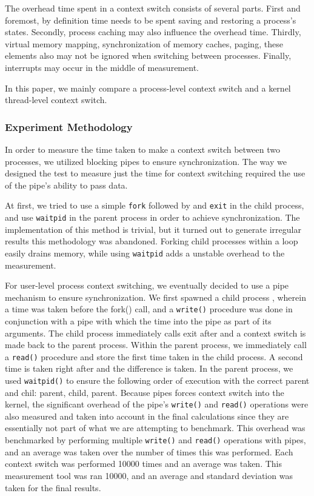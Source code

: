 \documentclass{article} %
\begin{document}
The overhead time spent in a context switch consists of several parts.  First
and foremost, by definition time needs to be spent saving and restoring
a process's states.  Secondly, process caching may also influence the overhead
time. Thirdly, virtual memory mapping, synchronization of memory caches,
paging, these elements also may not be ignored when switching between
processes. Finally, interrupts may occur in the middle of measurement.

In this paper, we mainly compare a process-level context switch and a kernel
thread-level context switch.

\subsubsection{Experiment Methodology}
In order to measure the time taken to make a context switch between two
processes, we utilized blocking pipes to ensure synchronization. The way we
designed the test to measure just the time for context switching required the
use of the pipe's ability to pass data.

At first, we tried to use a simple \texttt{fork} followed by and \texttt{exit}
in the child process, and use \texttt{waitpid} in the parent process in order
to achieve synchronization. The implementation of this method is trivial, but
it turned out to generate irregular results this methodology was abandoned. Forking child processes within
a loop easily drains memory, while using \texttt{waitpid} adds a unstable
overhead to the measurement.

For user-level process context switching, we eventually decided to use a pipe
mechanism to ensure synchronization. We first spawned a child process
, wherein a time was taken before the fork() call, and a \texttt{write()} procedure was done in conjunction with a pipe with which the time into the pipe as part of its arguments. The child process
immediately calls exit after and a context switch is made back to the parent
process.  Within the parent process, we immediately call a \texttt{read()}
procedure and store the first time taken in the child process.  A second time
is taken right after and the difference is taken. In the parent process, we
used \texttt{waitpid()} to ensure the following order of execution with the correct parent and chil: parent, child,
parent. Because pipes forces context switch into the kernel, the significant
overhead of the pipe's \texttt{write()} and \texttt{read()} operations were also
measured and taken into account in the final calculations since they are essentially not part of what we are attempting to benchmark. This overhead was benchmarked by performing multiple \texttt{write()} and \texttt{read()} operations with pipes, and an average was taken over the number of times this was performed. Each context switch
was performed 10000 times and an average was taken. This measurement tool was
ran 10000, and an average and standard deviation was taken for the final
results.
\end{document}
